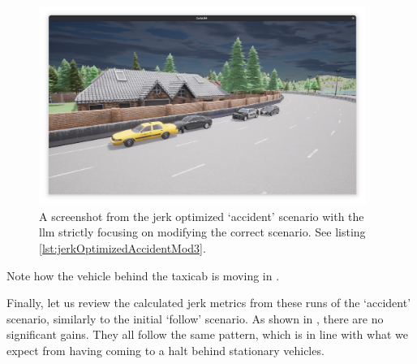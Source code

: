 \begin{figure}[htb]
    \centering
    \includegraphics[width=0.95\textwidth]{experiment-material/accident-pics/mod-3/freecam.png}
    \caption{A screenshot from the jerk optimized `accident' scenario with the \acrshort{llm}
        strictly focusing on modifying the correct scenario. See listing
        \ref{lst:jerkOptimizedAccidentMod3}.}\label{fig:accidentMod3FinalFreecam}
\end{figure}

Note how the vehicle behind the taxicab is moving in .

Finally, let us review the calculated jerk metrics from these runs of the `accident' scenario,
similarly to the initial `follow' scenario. As shown in , there are
no significant gains. They all follow the same pattern, which is in line with what we expect from
having
coming to a halt behind stationary vehicles.

